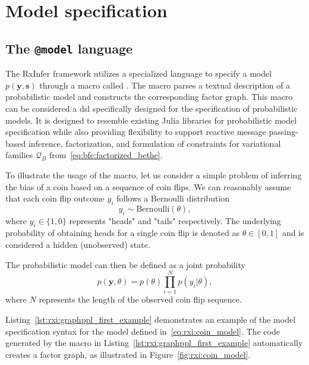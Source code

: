 \section{Model specification}\label{chapter-04:section:model-specification}

\subsection{The \texttt{@model} language}

The RxInfer framework utilizes a specialized language to specify a model $p(\bm{y},
  \bm{s})$ through a macro called .
The  macro parses a textual description of a probabilistic model and constructs
the corresponding factor graph.
This macro can be considered a \ac{dsl} specifically designed for the specification of probabilistic models.
It is designed to resemble existing Julia libraries for probabilistic model specification
while also providing flexibility to support reactive message passing-based inference,
factorization, and formulation of constraints for variational families $\mathcal{Q}_{B}$ from~\eqref{eq:bfe:factorized_bethe}.

To illustrate the usage of the  macro, let us consider a simple problem of
inferring the bias of a coin based on a sequence of coin flips.
We can reasonably assume that each coin flip outcome $y_i$ follows a Bernoulli distribution
\begin{equation}
y_i \sim \mathrm{Bernoulli}(\theta),
\end{equation} where $y_i \in \{ 1, 0 \}$ represents "heads" and "tails" respectively.
The underlying probability of obtaining heads for a single coin flip is denoted as $\theta \in
  [0, 1]$ and is considered a hidden (unobserved) state.

The probabilistic model can then be defined as a joint probability \begin{equation}
\label{eq:rxi:coin_model}
p(\bm{y}, \theta) = p(\theta) \prod_{i=1}^{N} p(y_i\vert \theta),
\end{equation}
where $N$ represents the length of the observed coin flip sequence.

Listing~\ref{lst:rxi:graphppl_first_example} demonstrates an example of the model
specification syntax for the model defined in~\eqref{eq:rxi:coin_model}.
The code generated by the  macro in Listing~\ref{lst:rxi:graphppl_first_example}
automatically creates a factor graph, as illustrated in Figure~\ref{fig:rxi:coin_model}.
\begin{figure*}[h!]
  \begin{adjustbox}{minipage=\textwidth,margin=0pt \smallskipamount,center}
  \end{adjustbox}
\end{figure*}


